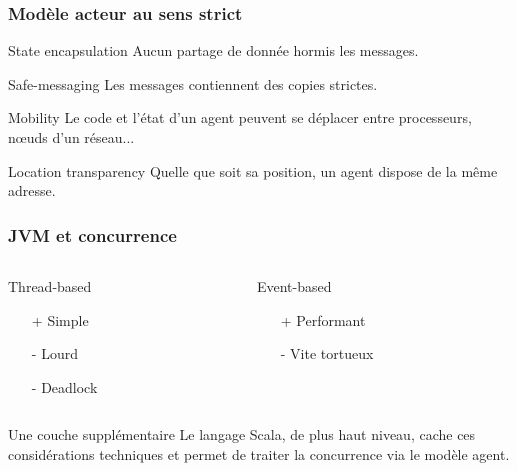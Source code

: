 \documentclass{beamer}
\begin{document}
\begin{frame}

  \frametitle{Modèle acteur au sens strict \cite{rajesh}}

  \begin{block}{State encapsulation}
    Aucun partage de donnée hormis les messages.
  \end{block}

  \begin{block}{Safe-messaging}
    Les messages contiennent des copies strictes.
  \end{block}

  \begin{block}{Mobility}
    Le code et l'état d'un agent peuvent se déplacer entre
    processeurs, n\oe uds d'un réseau...
  \end{block}

  \begin{block}{Location transparency}
    Quelle que soit sa position, un agent dispose de la même adresse.
  \end{block}

\end{frame}

\begin{frame}

  \frametitle{JVM et concurrence}

  \begin{columns}

    \begin{column}{0.5\textwidth}
      \begin{block}{Thread-based}
        \begin{itemize}
        \item[+]{Simple}
        \item[-]{Lourd}
        \item[-]{Deadlock}
        \end{itemize}
      \end{block}
    \end{column}

    \begin{column}{0.5\textwidth}
      \begin{block}{Event-based}
        \begin{itemize}
        \item[+]{Performant}
        \item[-]{Vite tortueux}
        \end{itemize}
      \end{block}
    \end{column}

  \end{columns}

  \vfill

   \begin{block}{Une couche supplémentaire}
     Le langage Scala, de plus haut niveau, cache ces considérations
     techniques et permet de traiter la concurrence via le modèle
     agent.
   \end{block}

\end{frame}
\end{document}
